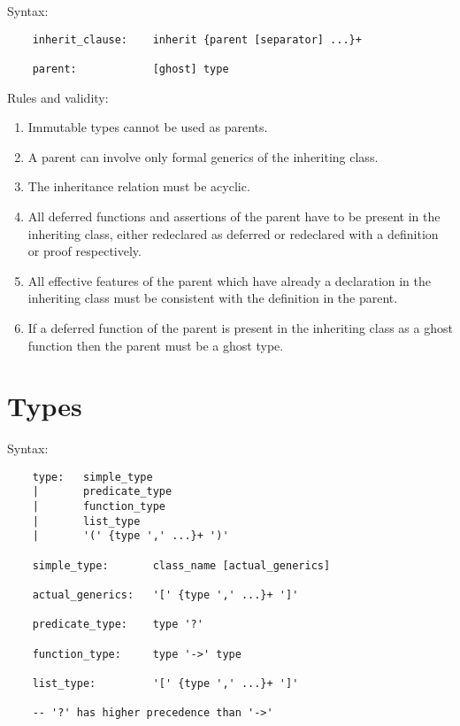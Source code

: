 \noindent Syntax:
\begin{lstlisting}
    inherit_clause:    inherit {parent [separator] ...}+

    parent:            [ghost] type
\end{lstlisting}

\noindent Rules and validity:
\begin{enumerate}
\item Immutable types cannot be used as parents.

\item A parent can involve only formal generics of the inheriting class.

\item The inheritance relation must be acyclic.

\item All deferred functions and assertions of the parent have to be present
  in the inheriting class, either redeclared as deferred or redeclared with a
  definition or proof respectively.

\item All effective features of the parent which have already a declaration in
  the inheriting class must be consistent with the definition in the parent.

\item If a deferred function of the parent is present in the inheriting class
  as a ghost function then the parent must be a ghost type.
\end{enumerate}

\section{Types}

\noindent Syntax:
\begin{lstlisting}
    type:   simple_type
    |       predicate_type
    |       function_type
    |       list_type
    |       '(' {type ',' ...}+ ')'

    simple_type:       class_name [actual_generics]

    actual_generics:   '[' {type ',' ...}+ ']'

    predicate_type:    type '?'

    function_type:     type '->' type

    list_type:         '[' {type ',' ...}+ ']'

    -- '?' has higher precedence than '->'
\end{lstlisting}


